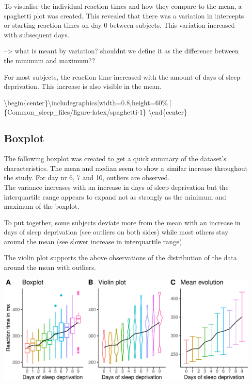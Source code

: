 \documentclass[
]{article}
\begin{document}
To visualise the individual reaction times and how they compare to the
mean, a spaghetti plot was created. This revealed that there was a
variation in intercepts or starting reaction times on day 0 between
subjects. This variation increased with subsequent days.

--\textgreater{} what is meant by variation? shouldnt we define it as
the difference between the minimum and maximum??

For most subjects, the reaction time increased with the amount of days
of sleep deprivation. This increase is also visible in the mean.

\textbackslash begin\{center\}\textbackslash includegraphics{[}width=0.8\linewidth,height=60\%
{]}\{Common\_sleep\_files/figure-latex/spaghetti-1\}
\textbackslash end\{center\}

\hypertarget{boxplot}{%
\subsection{Boxplot}\label{boxplot}}

The following boxplot was created to get a quick summary of the
dataset's characteristics. The mean and median seem to show a similar
increase throughout the study. For day nr 6, 7 and 10, outliers are
observed.\\
The variance increases with an increase in days of sleep deprivation but
the interquartile range appears to expand not as strongly as the minimum
and maximum of the boxplot.

To put together, some subjects deviate more from the mean with an
increase in days of sleep deprivation (see outliers on both sides) while
most others stay around the mean (see slower increase in interquartile
range).

The violin plot supports the above observations of the distribution of
the data around the mean with outliers.

\begin{center}\includegraphics[width=0.8\linewidth]{Common_sleep_files/figure-latex/boxplot-1} \end{center}
\end{document}
